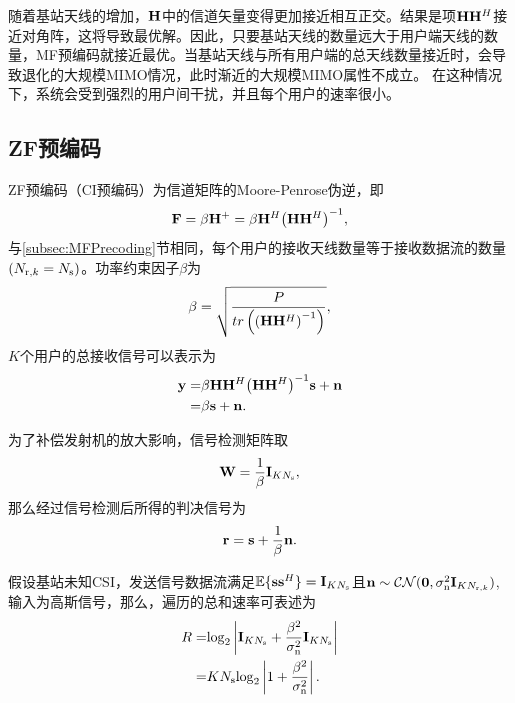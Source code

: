 随着基站天线的增加，${\bf{H}}$中的信道矢量变得更加接近相互正交。结果是项${{{\bf{H}}{{\bf{H}}^H}}}$接近对角阵，这将导致最优解。因此，只要基站天线的数量远大于用户端天线的数量，MF预编码就接近最优。当基站天线与所有用户端的总天线数量接近时，会导致退化的大规模MIMO情况，此时渐近的大规模MIMO属性不成立。 在这种情况下，系统会受到强烈的用户间干扰，并且每个用户的速率很小。

\subsection{ZF预编码}
ZF预编码（CI预编码）为信道矩阵的Moore-Penrose伪逆，即
\begin{equation}\label{chap2:eq26}
  {\bf{F}} = \beta {{\bf{H}}^+} = \beta {{\bf{H}}^H}{\left( {{\bf{H}}{{\bf{H}}^H}} \right)^{ - 1}},
\end{equation}
与\ref{subsec:MFPrecoding}节相同，每个用户的接收天线数量等于接收数据流的数量${({N_{{\rm{r}},k}} = {N_{\rm{s}}})}$。功率约束因子${\beta}$为
\begin{equation}\label{chap2:eq27}
  \beta  = \sqrt {\frac{P}{{tr\left( {{{\left( {{\bf{H}}{{\bf{H}}^H}} \right)}^{ - 1}}} \right)}}} ,
\end{equation}
${K}$个用户的总接收信号可以表示为
\begin{align}\label{chap2:eq28}
  \nonumber {\bf{y}} = &  \beta {\bf{H}}{{\bf{H}}^H}{\left( {{\bf{H}}{{\bf{H}}^H}} \right)^{ - 1}}{\bf{s}} + {\bf{n}} \\
   = & \beta {\bf{s}} + {\bf{n}}.
\end{align}

为了补偿发射机的放大影响，信号检测矩阵取
\begin{equation}\label{chap2:eq29}
  {\bf{W}} = \frac{1}{\beta }{{\bf{I}}_{K{N_{\rm{s}}}}},
\end{equation}
那么经过信号检测后所得的判决信号为
\begin{equation}\label{chap2:eq30}
  {\bf{r}} = {\bf{s}} + \frac{1}{\beta }{\bf{n}}.
\end{equation}

假设基站未知CSI，发送信号数据流满足${\mathbb{E}\{ {\bf{s}}{{\bf{s}}^H}\}  = {{\bf{I}}_{K{N_{\rm{s}}}}}}$且${{\bf{n}} \sim \mathcal{CN}({\bf{0}},\sigma _{\rm{n}}^2{{\bf{I}}_{K{{N_{{\rm{r}},k}}}}})}$, 输入为高斯信号，那么，遍历的总和速率可表述为
\begin{align}\label{chap2:eq31}
 \nonumber R = & {\log _2}\left| {{{\bf{I}}_{K{N_{\rm{s}}}}} + \frac{{{\beta ^2}}}{{\sigma _{\rm{n}}^2}}{{\bf{I}}_{K{N_{\rm{s}}}}}} \right| \\
  = & K{N_{\rm{s}}}{\log _2}\left| {1 + \frac{{{\beta ^2}}}{{\sigma _{\rm{n}}^2}}} \right|.
\end{align}


